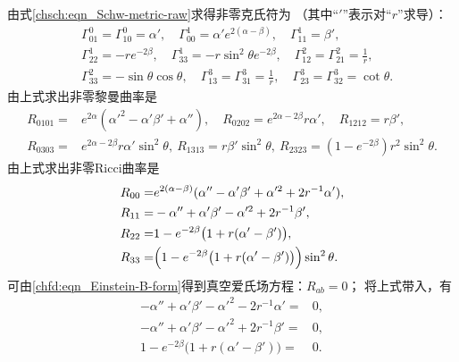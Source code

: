 由式\eqref{chsch:eqn_Schw-metric-raw}求得非零克氏符为
（其中“$'$”表示对“$r$”求导）：
\begin{subequations}\label{chsch:eqn_Schw-ksf-raw}
    \begin{align}
       &\Gamma^0_{01}= \Gamma^0_{10} = \alpha',\quad
        \Gamma^1_{00}= \alpha' e^{2(\alpha-\beta)}, \quad
        \Gamma^1_{11}= \beta', \\
       &\Gamma^1_{22}= -r e^{-2\beta}, \quad
       \Gamma^1_{33}= -r \sin^2\theta e^{-2\beta}, \quad
        \Gamma^2_{12}=\Gamma^2_{21}= \frac{1}{r}, \\
       &\Gamma^2_{33}=-\sin\theta \cos\theta, \quad
       \Gamma^3_{13}=\Gamma^3_{31}=\frac{1}{r}, \quad
        \Gamma^3_{23}=\Gamma^3_{32}=\cot\theta .
    \end{align}
\end{subequations}
由上式求出非零黎曼曲率是
\setlength{\mathindent}{0em}
\begin{subequations}\label{chsch:eqn_Schw-riemann-raw}
\begin{align}
R_{0101} =& e^{2 \alpha } \left(\alpha'^2- \alpha'\beta'+\alpha''\right), \quad
R_{0202} = e^{2 \alpha -2 \beta } r \alpha ', \quad
R_{1212} = r \beta ', \\
R_{0303} =& e^{2 \alpha -2 \beta } r \alpha ' \sin ^2\theta  , \
R_{1313} = r \beta ' \sin ^2\theta  ,\
R_{2323} = \left(1-e^{-2 \beta}\right) r^2 \sin ^2\theta.
\end{align}
\end{subequations}\setlength{\mathindent}{2em}
由上式求出非零Ricci曲率是
\begin{subequations}\label{chsch:eqn_Schw-ricci-raw}
\begin{align}
    R_{00} =&  e^{2(\alpha-\beta)} ( \alpha'' - \alpha'\beta'
      +\alpha'^2 +2 r^{-1} \alpha' ) , \\
    R_{11} =& - \alpha'' + \alpha'\beta' -\alpha'^2  +2 r^{-1} \beta'  , \\
    R_{22} =& 1 - e^{-2\beta} \bigl(1+ r(\alpha'-\beta')\bigr), \\
    R_{33} =& \Bigl(1 - e^{-2\beta} \bigl(1+ r(\alpha'-\beta')\bigr)\Bigr)\sin^2\theta .
\end{align}
\end{subequations}
可由\eqref{chfd:eqn_Einstein-B-form}得到真空爱氏场方程：$R_{ab}=0$；
将上式带入，有
\begin{align}
    - \alpha'' + \alpha'\beta' -\alpha'^2 -2 r^{-1} \alpha' =& 0 , \label{chsch:eqn_tmp-ab1} \\
    - \alpha'' + \alpha'\beta' -\alpha'^2 +2 r^{-1} \beta'  =& 0 , \label{chsch:eqn_tmp-ab2} \\
    1 - e^{-2\beta} \bigl(1+ r(\alpha'-\beta')\bigr) =& 0 . \label{chsch:eqn_tmp-ab3} 
\end{align}
